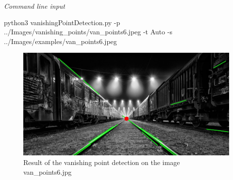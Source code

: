 \begin{multicols}{2}
\newpage
\noindent
\textit{Command line input}

\begin{bashscript}
    python3 vanishingPointDetection.py -p ../Images/vanishing_points/van_points6.jpeg -t Auto -s ../Images/examples/van_points6.jpeg
\end{bashscript}

\begin{figure}[H]
    \centering
    \includegraphics[width=0.98\columnwidth]{../Images/examples/van_points6.jpg}
    \caption{Result of the vanishing point detection on the image van\_points6.jpg}
    \label{fig-9}
\end{figure}

\end{multicols}
